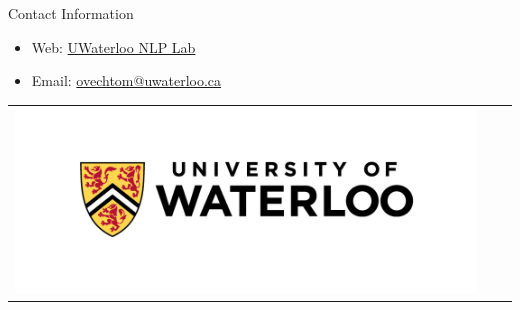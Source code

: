 \documentclass[final]{beamer}
\newlength{\onecolwid}
\begin{document}
\begin{frame}[t]
\begin{columns}[t]
\begin{column}{\onecolwid}
\begin{alertblock}{Contact Information}
                \begin{itemize}
                    \item Web: \href{https://ov-research.uwaterloo.ca/NLP_lab.html}{UWaterloo NLP Lab}
                    \item Email: \href{mailto:ovechtom@uwaterloo.ca}{ovechtom@uwaterloo.ca}
                \end{itemize}

            \end{alertblock}

            \begin{center}
                \begin{tabular}{ccc}
                    \includegraphics[width=0.4\linewidth]{uwaterloo-logo.png}
                \end{tabular}
            \end{center}


        \end{column} %

    \end{columns} %

\end{frame} %
\end{document}
